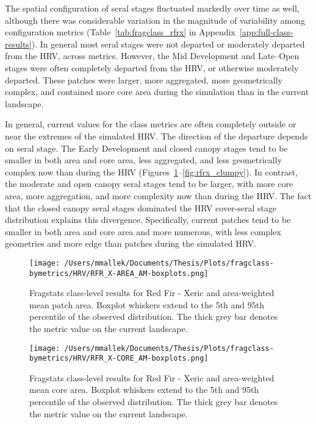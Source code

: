The spatial configuration of seral stages fluctuated markedly over time as well, although there was considerable variation in the magnitude of variability among configuration metrics (Table~\ref{tab:fragclass_rfrx} in Appendix~\ref{app:full-class-results}). In general most seral stages were not departed or moderately departed from the HRV, across metrics. However, the Mid Development and Late--Open stages were often completely departed from the HRV, or otherwise moderately departed. These patches were larger, more aggregated, more geometrically complex, and contained more core area during the simulation than in the current landscape.

In general, current values for the class metrics are often completely outside or near the extremes of the simulated HRV. The direction of the departure depends on seral stage. The Early Development and closed canopy stages tend to be smaller in both area and core area, less aggregated, and less geometrically complex now than during the HRV (Figures~\ref{fig:rfrx_areaam}--\ref{fig:rfrx_clumpy}). In contrast, the moderate and open canopy seral stages tend to be larger, with more core area, more aggregation, and more complexity now than during the HRV. The fact that the closed canopy seral stages dominated the HRV cover-seral stage distribution explains this divergence. Specifically, current patches tend to be smaller in both area and core area and more numerous, with less complex geometries and more edge than patches during the simulated HRV.


\begin{figure}[!htbp]
\centering
    \texttt{[image: /Users/mmallek/Documents/Thesis/Plots/fragclass-bymetrics/HRV/RFR\_X-AREA\_AM-boxplots.png]}
  \caption{Fragstats class-level results for Red Fir - Xeric and area-weighted mean patch area. Boxplot whiskers extend to the 5th and 95th percentile of the observed distribution. The thick grey bar denotes the metric value on the current landscape.}
  \label{fig:rfrx_areaam}
\end{figure}


\begin{figure}[!htbp]
\centering
    \texttt{[image: /Users/mmallek/Documents/Thesis/Plots/fragclass-bymetrics/HRV/RFR\_X-CORE\_AM-boxplots.png]}
  \caption{Fragstats class-level results for Red Fir - Xeric and area-weighted mean core area. Boxplot whiskers extend to the 5th and 95th percentile of the observed distribution. The thick grey bar denotes the metric value on the current landscape.}
  \label{fig:rfrx_coream}
\end{figure}


